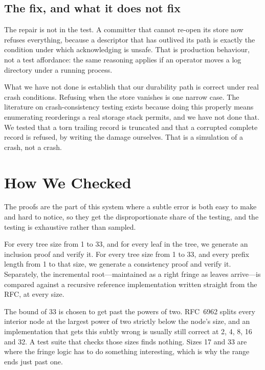 \documentclass[11pt]{article}
\begin{document}
\subsection{The fix, and what it does not fix}

The repair is not in the test. A committer that cannot re-open its store now
refuses everything, because a descriptor that has outlived its path is exactly
the condition under which acknowledging is unsafe. That is production
behaviour, not a test affordance: the same reasoning applies if an operator
moves a log directory under a running process.

What we have not done is establish that our durability path is correct under
real crash conditions. Refusing when the store vanishes is one narrow case.
The literature on crash-consistency testing \cite{pillai2014,zheng2014} exists
because doing this properly means enumerating reorderings a real storage stack
permits, and we have not done that. We tested that a torn trailing record is
truncated and that a corrupted complete record is refused, by writing the
damage ourselves. That is a simulation of a crash, not a crash.

\section{How We Checked}
\label{sec:method}

The proofs are the part of this system where a subtle error is both easy to
make and hard to notice, so they get the disproportionate share of the
testing, and the testing is exhaustive rather than sampled.

For every tree size from 1 to 33, and for every leaf in the tree, we generate
an inclusion proof and verify it. For every tree size from 1 to 33, and every
prefix length from 1 to that size, we generate a consistency proof and verify
it. Separately, the incremental root---maintained as a right fringe as leaves
arrive---is compared against a recursive reference implementation written
straight from the RFC, at every size.

The bound of 33 is chosen to get past the powers of two. RFC~6962 splits every
interior node at the largest power of two strictly below the node's size, and
an implementation that gets this subtly wrong is usually still correct at 2, 4,
8, 16 and 32. A test suite that checks those sizes finds nothing. Sizes 17 and
33 are where the fringe logic has to do something interesting, which is why the
range ends just past one.
\end{document}
